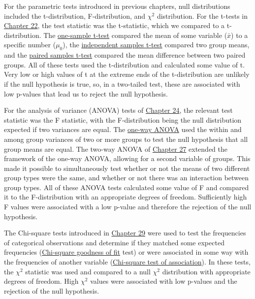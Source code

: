 \documentclass[
  openany]{krantz}
\begin{document}
For the parametric tests introduced in previous chapters, null distributions included the t-distribution, F-distribution, and \(\chi^{2}\) distribution.
For the t-tests in \protect\hyperlink{Chapter_22}{Chapter 22}, the test statistic was the t-statistic, which we compared to a t-distribution.
The \protect\hyperlink{one-sample-t-test}{one-sample t-test} compared the mean of some variable (\(\bar{x}\)) to a specific number (\(\mu_{0}\)), the \protect\hyperlink{independent-samples-t-test}{independent samples t-test} compared two group means, and the \protect\hyperlink{paired-sample-t-test}{paired samples t-test} compared the mean difference between two paired groups.
All of these tests used the t-distribution and calculated some value of t.
Very low or high values of t at the extreme ends of the t-distribution are unlikely if the null hypothesis is true, so, in a two-tailed test, these are associated with low p-values that lead us to reject the null hypothesis.

\newpage

For the analysis of variance (ANOVA) tests of \protect\hyperlink{Chapter_24}{Chapter 24}, the relevant test statistic was the F statistic, with the F-distribution being the null distribution expected if two variances are equal.
The \protect\hyperlink{one-way-anova}{one-way ANOVA} used the within and among group variances of two or more groups to test the null hypothesis that all group means are equal.
The two-way ANOVA of \protect\hyperlink{Chapter_27}{Chapter 27} extended the framework of the one-way ANOVA, allowing for a second variable of groups.
This made it possible to simultaneously test whether or not the means of two different group types were the same, and whether or not there was an interaction between group types.
All of these ANOVA tests calculated some value of F and compared it to the F-distribution with an appropriate degrees of freedom.
Sufficiently high F values were associated with a low p-value and therefore the rejection of the null hypothesis.

The Chi-square tests introduced in \protect\hyperlink{Chapter_29}{Chapter 29} were used to test the frequencies of categorical observations and determine if they matched some expected frequencies (\protect\hyperlink{chi-squared-goodness-of-fit}{Chi-square goodness of fit} test) or were associated in some way with the frequencies of another variable (\protect\hyperlink{chi-squared-test-of-association}{Chi-square test of association}).
In these tests, the \(\chi^{2}\) statistic was used and compared to a null \(\chi^{2}\) distribution with appropriate degrees of freedom.
High \(\chi^{2}\) values were associated with low p-values and the rejection of the null hypothesis.
\end{document}
